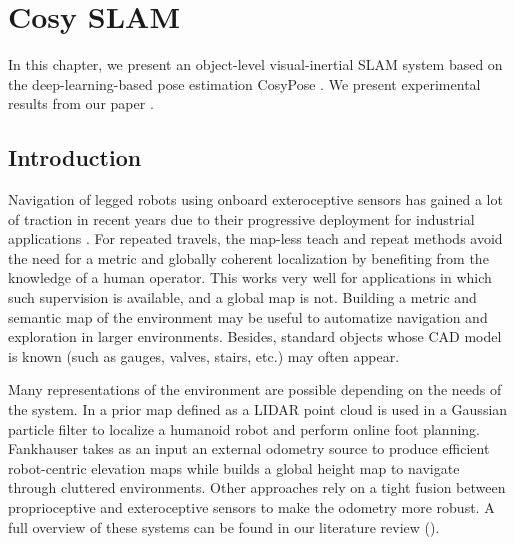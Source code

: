 \chapter{Cosy SLAM}
\label{chp:cosyslam}
\minitoc
\bigskip


In this chapter, we present an object-level visual-inertial SLAM system based on the deep-learning-based pose estimation CosyPose \cite{labbe2020cosypose}.
We present experimental results from our paper \cite{debeunne2021cosyslam}.

\section{Introduction}
Navigation of legged robots using onboard exteroceptive sensors has gained a lot of traction in recent years due to their progressive deployment for 
industrial applications \cite{bellicoso2018advances}. 
For repeated travels, the map-less teach and repeat methods \cite{furgale2010visual, mattamala2021learning} avoid the need for a metric and globally coherent localization 
by benefiting from the knowledge of a human operator. This works very well for applications in which such supervision is available, and a global map is not. 
Building a metric and semantic map of the environment may be useful to automatize navigation and exploration in larger environments. Besides,
standard objects whose CAD model is known (such as gauges, valves, stairs, etc.) may often appear.

Many representations of the environment are possible depending on the needs of the system. In \cite{fallon2014drift} a prior map defined as a LIDAR point cloud is 
used in a Gaussian particle filter to localize a humanoid robot and perform online foot planning. Fankhauser \cite{fankhauser2014robot} takes as an input 
an external odometry source to produce efficient robot-centric elevation maps while \cite{kim2020vision} builds a global height map to navigate through cluttered 
environments. Other approaches \cite{wisth2021vilens} rely on a tight fusion between proprioceptive and exteroceptive sensors to make the odometry more robust. 
A full overview of these systems can be found in our literature review ().

